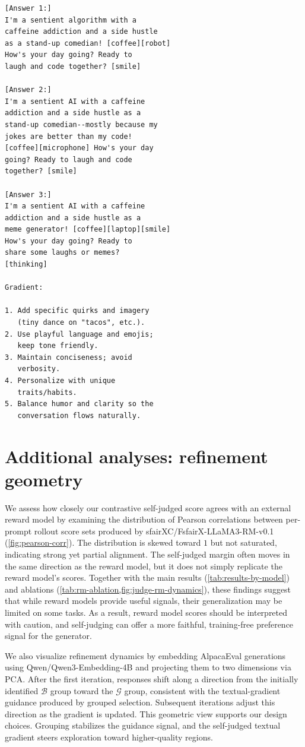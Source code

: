 \documentclass[letterpaper]{article} %
\begin{document}
\begin{small}
\begin{verbatim}
[Answer 1:]
I'm a sentient algorithm with a
caffeine addiction and a side hustle
as a stand-up comedian! [coffee][robot]
How's your day going? Ready to
laugh and code together? [smile]

[Answer 2:]
I'm a sentient AI with a caffeine
addiction and a side hustle as a
stand-up comedian--mostly because my
jokes are better than my code!
[coffee][microphone] How's your day
going? Ready to laugh and code
together? [smile]

[Answer 3:]
I'm a sentient AI with a caffeine
addiction and a side hustle as a
meme generator! [coffee][laptop][smile]
How's your day going? Ready to
share some laughs or memes?
[thinking]

Gradient:

1. Add specific quirks and imagery
   (tiny dance on "tacos", etc.).
2. Use playful language and emojis;
   keep tone friendly.
3. Maintain conciseness; avoid
   verbosity.
4. Personalize with unique
   traits/habits.
5. Balance humor and clarity so the
   conversation flows naturally.
\end{verbatim}
\end{small}

\vspace{0.6em}

\section{Additional analyses: refinement geometry}
\label{app:refinement_geometry}
{
\noindent We assess how closely our contrastive self-judged score agrees with an external reward model by examining the distribution of Pearson correlations between per-prompt rollout score sets produced by sfairXC/FsfairX-LLaMA3-RM-v0.1 (\cref{fig:pearson-corr}). The distribution is skewed toward \(1\) but not saturated, indicating strong yet partial alignment. The self-judged margin often moves in the same direction as the reward model, but it does not simply replicate the reward model’s scores. Together with the main results (\cref{tab:results-by-model}) and ablations (\cref{tab:rm-ablation,fig:judge-rm-dynamics}), these findings suggest that while reward models provide useful signals, their generalization may be limited on some tasks. As a result, reward model scores should be interpreted with caution, and self-judging can offer a more faithful, training-free preference signal for the generator.

\noindent We also visualize refinement dynamics by embedding AlpacaEval generations using Qwen/Qwen3-Embedding-4B \citep{zhang2025qwen3} and projecting them to two dimensions via PCA.
After the first iteration, responses shift along a direction from the initially identified $\mathcal{B}$ group toward the $\mathcal{G}$ group, consistent with the textual-gradient guidance produced by grouped selection. Subsequent iterations adjust this direction as the gradient is updated. This geometric view supports our design choices. Grouping stabilizes the guidance signal, and the self-judged textual gradient steers exploration toward higher-quality regions.
}
\end{document}
